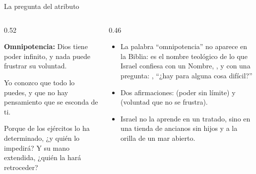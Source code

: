 \begin{frame}{La pregunta del atributo}
\begin{columns}[c,onlytextwidth]
\begin{column}{0.52\textwidth}
\begin{tcolorbox}[colback=papiro,colframe=azul,boxrule=1pt,arc=3pt]
\small\textbf{Omnipotencia:} Dios tiene poder infinito, y nada puede frustrar su voluntad.
\end{tcolorbox}
\begin{cita}Yo conozco que todo lo puedes, y que no hay pensamiento que se esconda de ti.\end{cita}
\begin{cita}Porque \SENOR{} de los ejércitos lo ha determinado, ¿y quién lo impedirá? Y su mano extendida, ¿quién la hará retroceder?\end{cita}
\end{column}
\begin{column}{0.46\textwidth}\small
\begin{itemize}
\item La palabra ``omnipotencia'' no aparece en la Biblia: es el nombre teológico de lo que Israel confiesa con un Nombre, , y con una pregunta: , ``¿hay para \SENOR{} alguna cosa difícil?''
\item Dos afirmaciones:  (poder sin límite) y  (voluntad que no se frustra).
\item Israel no la aprende en un tratado, sino en una tienda de ancianos sin hijos y a la orilla de un mar abierto.
\end{itemize}
\end{column}
\end{columns}
\end{frame}

